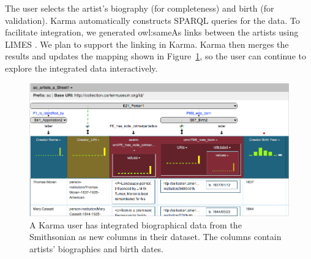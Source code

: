 The user selects the artist's biography (for completeness) and birth (for validation). Karma automatically constructs SPARQL queries for the data.
To facilitate integration, we generated owl:sameAs links between the artists using LIMES \cite{ngomo2011limes}.  
We plan to support the linking in Karma.
Karma then merges the results and updates the mapping shown in Figure~\ref{fig:augment-screenshot}, so the user can continue to explore the integrated data interactively. 
\begin{figure}[bt]
\centering
\includegraphics[width=4.9in]{images/6-augment.png}
\vspace{-5mm}
\caption{A Karma user has integrated biographical data from the Smithsonian as new columns in their dataset. The columns contain artists' biographies and birth dates.}
\vspace{-15pt}
\label{fig:augment-screenshot}
\end{figure}